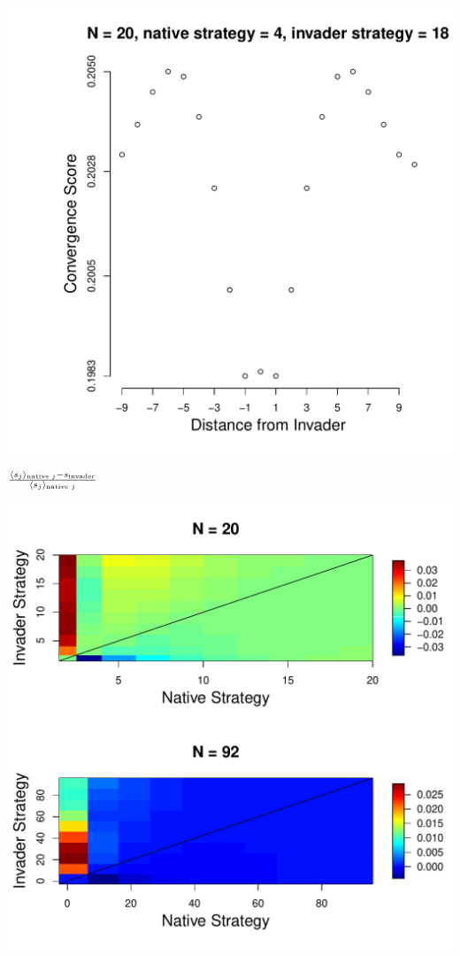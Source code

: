 \documentclass{beamer}
\begin{document}
\begin{frame}
\begin{center}
\includegraphics[width=.75\textwidth]{convergence_scores_one_network.pdf}
\end{center}
\end{frame}

\begin{frame}
\begin{center}$\small{\frac{\langle s_j\rangle _{\text{native }j}-s_\text{invader}}{\langle s_j\rangle _{\text{native }j}}}$ \end{center}
\begin{center}
\includegraphics[width=.75\textwidth]{invader_advantage.pdf}
\end{center}
\end{frame}
\end{document}
